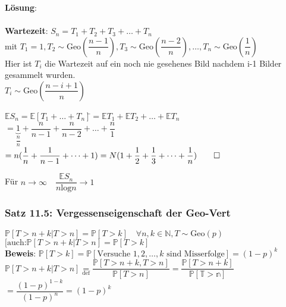 \textbf{Lösung}:\\
\\
\textbf{Wartezeit}: $S_n = T_1+T_2+T_3+\dots+T_n$\smallskip\\
mit $T_1 =1, T_2 \sim \text{Geo}(\dfrac{n-1}{n}),T_3\sim \text{Geo}(\dfrac{n-2}{n}),\dots,T_n\sim \text{Geo}(\dfrac{1}{n})$\medskip\\
Hier ist $T_i$ die Wartezeit auf ein noch nie gesehenes Bild nachdem i-1 Bilder gesammelt wurden.\smallskip\\
$T_i \sim \text{Geo}(\dfrac{n-i+1}{n})$\smallskip\\
\begin{tabbing}
	$\mathds{E}S_n = \mathds{E}[T_1+\dots+T_n]$\=$ = \mathds{E}T_1+\mathds{E}T_2+\dots+\mathds{E}T_n$\\
	\> $= \underbrace{1}_{\dfrac{n}{n}}+\dfrac{n}{n-1}+\dfrac{n}{n-2}+\dots+\dfrac{n}{1}$\\
	\>$=n(\dfrac{1}{n}+\dfrac{1}{n-1}+\dots+1)= N(1+\dfrac{1}{2}+\dfrac{1}{3}+\dots+\dfrac{1}{n}) \qed$
\end{tabbing}
Für $n \rightarrow\infty \quad \dfrac{\mathds{E}S_n}{n \text{log}n}\rightarrow1$
\subsubsection{Satz 11.5: Vergessenseigenschaft der Geo-Vert}
$\mathds{P}[T>n+k\vert T>n]=\mathds{P}[T>k] \quad \forall n,k \in \mathds{N}, T \sim \text{Geo}(p)$\\
$[\text{auch:}\mathds{P}[T>n+k\vert T>n]=\mathds{P}[T>k]$\medskip\\
\textbf{Beweis}: $\mathds{P}[T>k] = \mathds{P}[\text{Versuche } 1,2,\dots,k \text{ sind Misserfolge}]=(1-p)^k$\smallskip\\
$\mathds{P}[T>n+k\vert T>n]\underset{\text{def}}{=} \dfrac{\mathds{P}[T>n+k, T>n]}{\mathds{P}[T>n]} = \dfrac{\mathds{P}[T>n+k]}{\mathds{P[T>n]}}$\\$=\dfrac{(1-p)^{1-k}}{(1-p)^n}=(1-p)^k$


